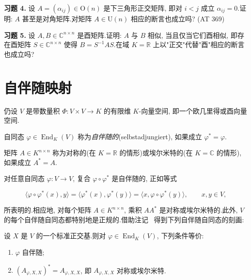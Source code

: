 \medskip
\noindent\textbf{习题 4.} 设 $A = (\alpha_{ij}) \in \mathrm{O}(n)$ 是下三角形正交矩阵, 即对 $i < j$ 成立 $\alpha_{ij} = 0$.证明: $A$ 甚至是对角矩阵.对矩阵 $A \in \mathrm{U}(n)$ 相应的断言也成立吗? (AT 369)

\medskip
\noindent\textbf{习题 5.} 设 $A, B \in \mathbb{C}^{n \times n}$ 是酉矩阵.证明: $A$ 与 $B$ 相似, 当且仅当它们酉相似, 即存在酉矩阵 $S \in \mathbb{C}^{n \times n}$ 使得 $B = S^{-1} A S$.在域 $K = \mathbb{R}$ 上以"正交"代替"酉"相应的断言也成立吗?

\section{自伴随映射}\label{sec:7.6}

仍设 $V$ 是带数量积 $\varPhi \colon V \times V \longrightarrow K$ 的有限维 $K$-向量空间, 即一个欧几里得或酉向量空间.

\begin{definition}\label{def:7.6.1}
自同态 $\varphi \in \operatorname{End}_K(V)$ 称为\emph{自伴随的}(\textup{selbstadjungiert}), 如果成立 $\varphi^* = \varphi$.

矩阵 $A \in K^{n \times n}$ 称为对称的(在 $K = \mathbb{R}$ 的情形)或埃尔米特的(在 $K = \mathbb{C}$ 的情形), 如果成立 $A^* = A$.
\end{definition}

对任意自同态 $\varphi \colon V \longrightarrow V$, 复合 $\varphi \circ \varphi^*$ 是自伴随的, 正如等式

\[
\bigl\langle \varphi \circ \varphi^*(x), y \bigr\rangle = \bigl\langle \varphi^*(x), \varphi^*(y) \bigr\rangle = \bigl\langle x, \varphi \circ \varphi^*(y) \bigr\rangle, \qquad x, y \in V,
\]

所表明的.相应地, 对每个矩阵 $A \in K^{n \times n}$, 乘积 $A A^*$ 是对称或埃尔米特的.此外, $V$ 的每个自伴随自同态都特别地是正规的.借助注记~ 得到下列自伴随自同态的刻画:

\begin{remark}\label{rem:7.6.2}
设 $X$ 是 $V$ 的一个标准正交基.则对 $\varphi \in \operatorname{End}_K(V)$, 下列条件等价:
\begin{enumerate}
\item[(i)] $\varphi$ 自伴随;
\item[(ii)] $(A_{\varphi, X, X})^* = A_{\varphi, X, X}$, 即 $A_{\varphi, X, X}$ 对称或埃尔米特.
\end{enumerate}
\end{remark}

